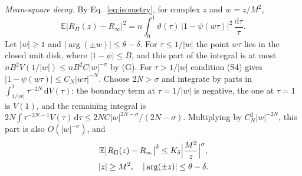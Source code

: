 \documentclass[a4paper,11pt]{article}
\newcommand{\bE}{\mathbb{E}}
\newcommand{\dd}{\mathrm{d}}
\begin{document}
\textit{Mean-square decay.} By Eq.~\eqref{eq:isometry}, for complex $z$ and $w=z/M^2$,
\begin{equation}
\label{eq:msq}
\bE\bigl|R_\Pi(z)-R_\infty\bigr|^2=n\int_0^1\vartheta(\tau)\,\bigl|1-\psi(w\tau)\bigr|^2\,\frac{\dd\tau}\tau .
\end{equation}
Let $|w|\ge1$ and $|\arg(\pm w)|\le\theta-\delta$. For $\tau\le1/|w|$ the point $w\tau$ lies in the closed unit disk, where $|1-\psi|\le B$, and this part of the integral is at most $nB^2V(1/|w|)\le nB^2C|w|^{-\sigma}$ by (G). For $\tau>1/|w|$ condition (S4) gives $|1-\psi(w\tau)|\le C_N|w\tau|^{-N}$. Choose $2N>\sigma$ and integrate by parts in $\int_{1/|w|}^1\tau^{-2N}\,\dd V(\tau)$: the boundary term at $\tau=1/|w|$ is negative, the one at $\tau=1$ is $V(1)$, and the remaining integral is $2N\int\tau^{-2N-1}V(\tau)\,\dd\tau\le2NC|w|^{2N-\sigma}/(2N-\sigma)$. Multiplying by $C_N^2|w|^{-2N}$, this part is also $O(|w|^{-\sigma})$, and
\begin{equation}
\label{eq:msdecay}
\begin{gathered}
\bE\bigl|R_\Pi(z)-R_\infty\bigr|^2\le K_\delta\Bigl|\frac{M^2}z\Bigr|^{\sigma},\\
|z|\ge M^2,\quad|\arg(\pm z)|\le\theta-\delta .
\end{gathered}
\end{equation}
\end{document}
